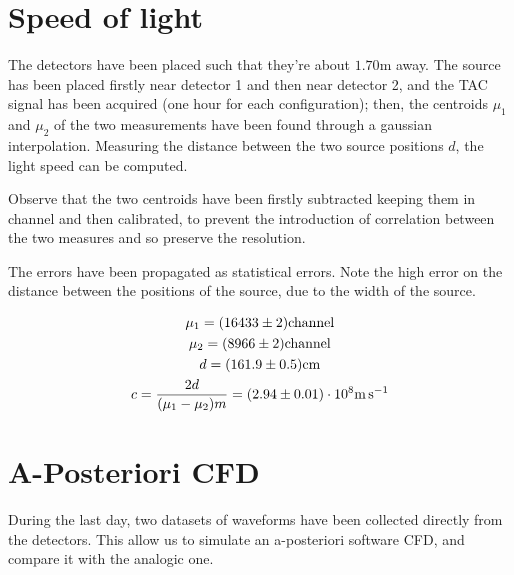 \documentclass[11pt,a4 paper]{article}
\let\oldfrac\frac
\renewcommand{\frac}[3][d]{\ifthenelse{\equal{#1}{d}}{\oldfrac{#2}{#3}}{\nicefrac{#2}{#3}}}
\begin{document}

\section{Speed of light}
The detectors have been placed such that they're about $1.70\si{\metre}$ away. The source has been placed firstly near detector 1 and then near detector 2, and the TAC signal has been acquired (one hour for each configuration); then, the centroids $\mu_1$ and $\mu_2$ of the two measurements have been found through a gaussian interpolation. Measuring the distance between the two source positions $d$, the light speed can be computed.

Observe that the two centroids have been firstly subtracted keeping them in channel and then calibrated, to prevent the introduction of correlation between the two measures and so preserve the resolution.

The errors have been propagated as statistical errors. Note the high error on the distance between the positions of the source, due to the width of the source.

\begin{gather*}
    \mu_1 = (16433 \pm 2)\si{channel}\\
    \mu_2 = (8966 \pm 2)\si{channel} \\
    d = (161.9 \pm 0.5) \si{\centi\metre} \\
    c = \frac{2d}{(\mu_1-\mu_2)m} = (2.94 \pm 0.01 )\cdot 10^8 \si{\metre\per\second}
\end{gather*}

\section{A-Posteriori CFD}
During the last day, two datasets of waveforms have been collected directly from the detectors. This allow us to simulate an a-posteriori software CFD, and compare it with the analogic one.
\end{document}
